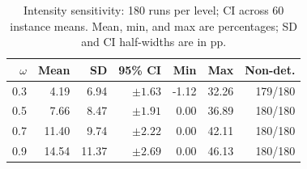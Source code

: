 \begin{table}[!t]
\centering
\footnotesize
\caption{Intensity sensitivity: 180 runs per level; CI across 60 instance means. Mean, min, and max are percentages; SD and CI half-widths are in pp.}
\label{tab:omega_sensitivity}
\setlength{\tabcolsep}{3pt}
\renewcommand{\arraystretch}{1.12}
\begin{tabular}{rrrrrrr}
\toprule
$\omega$ & Mean & SD & 95\% CI & Min & Max & Non-det. \\
\midrule
0.3 & 4.19 & 6.94 & $\pm 1.63$ & -1.12 & 32.26 & 179/180 \\
0.5 & 7.66 & 8.47 & $\pm 1.91$ & 0.00 & 36.89 & 180/180 \\
0.7 & 11.40 & 9.74 & $\pm 2.22$ & 0.00 & 42.11 & 180/180 \\
0.9 & 14.54 & 11.37 & $\pm 2.69$ & 0.00 & 46.13 & 180/180 \\
\bottomrule
\end{tabular}
\end{table}
